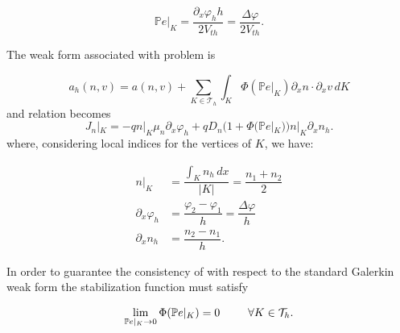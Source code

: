  \begin{equation*}
 \mathbb{P}e|_K = \dfrac{\partial_x \varphi_h h}{2V_{th}}  = \dfrac{\Delta \varphi }{2 V_{th}}.
 \end{equation*}
 
The weak form associated with problem  is

\begin{equation}
\label{eq: weak form perturbed}
a_h(n,v) = a(n,v) + \sum_{K\in \mathcal{T}_h}\int_{K} \Phi(\mathbb{P}e|_K) \partial_x n \cdot \partial_x v \, dK
\end{equation}
and relation  becomes
\begin{equation}
\label{eq: j element 1d perturbata}
J_n|_K = -qn|_K\mu_n\partial_x \varphi_h + qD_n(1+\Phi(\mathbb{P}e|_K)) n|_K\partial_x n_h .
\end{equation}
where, considering local indices for the vertices of $K$, we have:

\begin{align*}
n|_K & = \dfrac{\int_K n_h \, dx}{|K|} = \dfrac{n_1+n_2}{2} \\
\partial_x \varphi_h & = \dfrac{\varphi_2-\varphi_1}{h} = \dfrac{\Delta \varphi}{h}\\
\partial_x n_h & = \dfrac{n_2 - n_1}{h}.
\end{align*}

In order to guarantee the consistency of  with respect to the standard Galerkin weak form the  stabilization function must satisfy

\begin{align}
\label{eq: consistenza}
\lim_{\mathbb{P}e|_K \to 0} \Phi(\mathbb{P}e|_K) = 0 \psp{15} \forall K\in\mathcal{T}_h.
\end{align}



